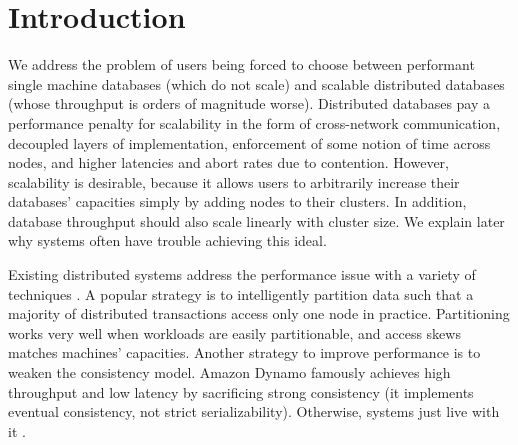 \section{Introduction}


 We address the problem of users being forced to choose between performant single machine databases (which do not scale) and scalable distributed databases (whose throughput is orders of magnitude worse). Distributed databases pay a performance penalty for scalability in the form of cross-network communication, decoupled layers of implementation, enforcement of some notion of time across nodes, and higher latencies and abort rates due to contention. However, scalability is desirable, because it allows users to arbitrarily increase their databases' capacities simply by adding nodes to their clusters. In addition, database throughput should also scale linearly with cluster size. We explain later  why systems often have trouble achieving this ideal.

 Existing distributed systems address the performance issue with a variety of techniques . A popular strategy is to intelligently partition data such that a majority of distributed transactions access only one node in practice\cite{partionskewpavlo, slog}. Partitioning works very well when workloads are easily partitionable, and access skews matches machines' capacities.  Another strategy to improve performance is to weaken the consistency model. Amazon Dynamo \cite{dynamo} famously achieves high throughput and low latency by sacrificing strong consistency (it implements eventual consistency, not strict serializability). Otherwise, systems just live with it \cite{aurora, calvin, spanner, cockroachdb}. 

